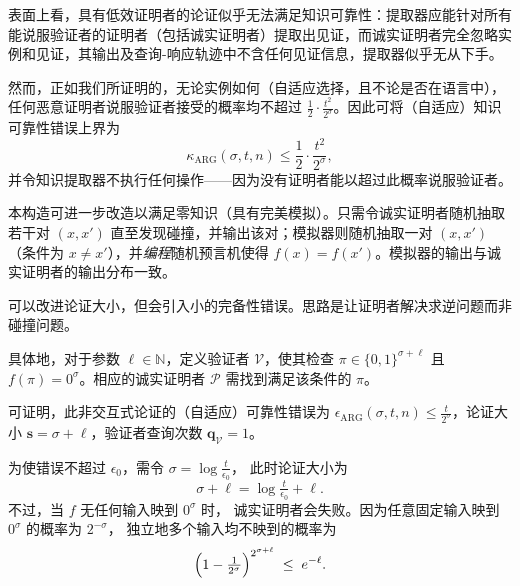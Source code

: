 \documentclass[american,singlepageview]{snargs-book-zh}
\newcommand{\Bits}{\{0,1\}}
\newcommand{\Naturals}{\mathbb{N}}
\newcommand{\InstanceSize}{n}
\newcommand{\ProtoProver}{P}
\newcommand{\ProtoVerifier}{V}
\newcommand{\ProtoSoundnessError}{\epsilon}
\newcommand{\ProtoKnowledgeError}{\kappa}
\newcommand{\ARGSubscript}{\scriptscriptstyle\mathrm{ARG}}
\newcommand{\ARGFormat}[1]{\mathcal{#1}}
\newcommand{\ARGProver}{\ARGFormat{\ProtoProver}}
\newcommand{\ARGVerifier}{\ARGFormat{\ProtoVerifier}}
\newcommand{\ARGString}{\pi}
\newcommand{\ARGTargetSoundnessError}{\ProtoSoundnessError_{0}}
\newcommand{\ARGSoundnessError}{\ProtoSoundnessError_{\ARGSubscript}}
\newcommand{\ARGKnowledgeError}{\ProtoKnowledgeError_{\ARGSubscript}}
\newcommand{\ARGComplexityFormat}[1]{\mathbf{#1}}
\newcommand{\ARGQueryV}{\ARGComplexityFormat{q}_{\scriptscriptstyle\ARGVerifier}}
\newcommand{\ARGLength}{\ARGComplexityFormat{s}}
\newcommand{\ROFunction}{f}
\newcommand{\ROQueryBound}{t}
\newcommand{\ROQuery}{x}
\newcommand{\ROOutputSize}{\sigma}
\newcommand{\ROCommonExpression}[2]{\frac{1}{2} \cdot \frac{#2^2}{2^{#1}}}
\begin{document}
\begin{remark}[知识可靠性]
\label{remark:inefficient-narg-knowledge-soundess}
表面上看，具有低效证明者的论证似乎无法满足知识可靠性：提取器应能针对所有能说服验证者的证明者（包括诚实证明者）提取出见证，而诚实证明者完全忽略实例和见证，其输出及查询-响应轨迹中不含任何见证信息，提取器似乎无从下手。

然而，正如我们所证明的，无论实例如何（自适应选择，且不论是否在语言中），任何恶意证明者说服验证者接受的概率均不超过
$\ROCommonExpression{\ROOutputSize}{\ROQueryBound}$。因此可将（自适应）知识可靠性错误上界为
\[
\ARGKnowledgeError(\ROOutputSize,\ROQueryBound,\InstanceSize)
\le
\ROCommonExpression{\ROOutputSize}{\ROQueryBound},
\]
并令知识提取器不执行任何操作——因为没有证明者能以超过此概率说服验证者。
\end{remark}

\begin{remark}[零知识]
\label{remark:inefficient-narg-zero-knowledge}
本构造可进一步改造以满足零知识（具有完美模拟）。只需令诚实证明者随机抽取若干对 $(\ROQuery,\ROQuery')$ 直至发现碰撞，并输出该对；模拟器则随机抽取一对 $(\ROQuery,\ROQuery')$（条件为 $\ROQuery\neq\ROQuery'$），并\emph{编程}随机预言机使得
$\ROFunction(\ROQuery)=\ROFunction(\ROQuery')$。模拟器的输出与诚实证明者的输出分布一致。
\end{remark}

\begin{remark}[改进论证大小]
\label{remark:inefficient-prover-narg-improvement}
可以改进论证大小，但会引入小的完备性错误。思路是让证明者解决求逆问题而非碰撞问题。

具体地，对于参数 $\ell\in\Naturals$，定义验证者 $\ARGVerifier$，使其检查
$\ARGString\in\Bits^{\ROOutputSize+\ell}$ 且
$\ROFunction(\ARGString)=0^{\ROOutputSize}$。相应的诚实证明者
$\ARGProver$ 需找到满足该条件的 $\ARGString$。

可证明，此非交互式论证的（自适应）可靠性错误为
$\ARGSoundnessError(\ROOutputSize,\ROQueryBound,\InstanceSize)\le
\frac{\ROQueryBound}{2^{\ROOutputSize}}$，论证大小
$\ARGLength=\ROOutputSize+\ell$，验证者查询次数 $\ARGQueryV=1$。

为使错误不超过 $\ARGTargetSoundnessError$，需令
$\ROOutputSize=\log\frac{\ROQueryBound}{\ARGTargetSoundnessError}$，
此时论证大小为
\[
\ROOutputSize+\ell
=\log\tfrac{\ROQueryBound}{\ARGTargetSoundnessError}+\ell.
\]
不过，当 $\ROFunction$ 无任何输入映到 $0^{\ROOutputSize}$ 时，
诚实证明者会失败。因为任意固定输入映到
$0^{\ROOutputSize}$ 的概率为 $2^{-\ROOutputSize}$，
独立地多个输入均不映到的概率为
\[
\Bigl(1 - \tfrac{1}{2^{\ROOutputSize}}\Bigr)^{2^{\ROOutputSize+\ell}}
\;\le\; e^{-\ell}.
\]
\end{remark}
\end{document}
